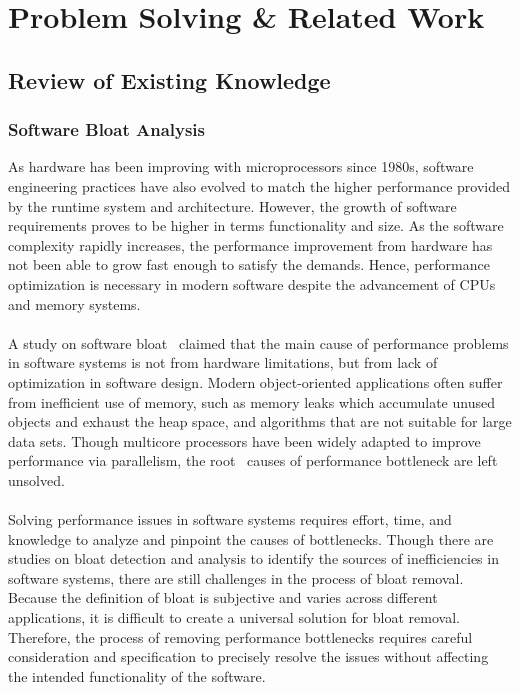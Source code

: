 \section{Problem Solving \& Related Work}
\label{sec:problem-solving-related-work}

\subsection{Review of Existing Knowledge}
\label{subsec:review-of-existing-knowledge}

\subsubsection*{Software Bloat Analysis}

As hardware has been improving with microprocessors since 1980s, software engineering practices have 
also evolved to match the higher performance provided by the runtime system and architecture.
However, the growth of software requirements proves to be higher in terms functionality and size.
As the software complexity rapidly increases, the performance improvement from hardware has not been 
able to grow fast enough to satisfy the demands.
Hence, performance optimization is necessary in modern software despite the advancement of CPUs and 
memory systems.
\\\\
A study on software bloat~\cite{Software_Bloat_Analysis} claimed that the main cause of performance 
problems in software systems is not from hardware limitations, but from lack of optimization in software design.
Modern object-oriented applications often suffer from inefficient use of memory, such as memory leaks 
which accumulate unused objects and exhaust the heap space, and algorithms that are not suitable for 
large data sets.
Though multicore processors have been widely adapted to improve performance via parallelism, the root \
causes of performance bottleneck are left unsolved.
\\\\
Solving performance issues in software systems requires effort, time, and knowledge to analyze and 
pinpoint the causes of bottlenecks.
Though there are studies on bloat detection and analysis to identify the sources of inefficiencies 
in software systems, there are still challenges in the process of bloat removal.
Because the definition of bloat is subjective and varies across different applications, it is difficult 
to create a universal solution for bloat removal.
Therefore, the process of removing performance bottlenecks requires careful consideration and specification 
to precisely resolve the issues without affecting the intended functionality of the software.

